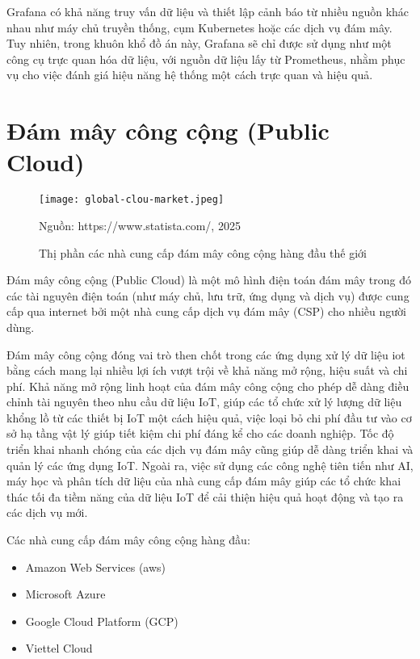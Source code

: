 Grafana có khả năng truy vấn dữ liệu và thiết lập cảnh báo từ nhiều nguồn khác nhau như máy chủ truyền thống, cụm Kubernetes hoặc các dịch vụ đám mây. Tuy nhiên, trong khuôn khổ đồ án này, Grafana sẽ chỉ được sử dụng như một công cụ trực quan hóa dữ liệu, với nguồn dữ liệu lấy từ Prometheus, nhằm phục vụ cho việc đánh giá hiệu năng hệ thống một cách trực quan và hiệu quả.

\section{Đám mây công cộng (Public Cloud)}

\begin{figure}[htbp]
    \centering
    \texttt{[image: global-clou-market.jpeg]}
    \caption{Thị phần các nhà cung cấp đám mây công cộng hàng đầu thế giới}
    \footnotesize{Nguồn: https://www.statista.com/, 2025}
\end{figure}

Đám mây công cộng (Public Cloud) là một mô hình điện toán đám mây trong đó các tài nguyên điện toán (như máy chủ, lưu trữ, ứng dụng và dịch vụ) được cung cấp qua internet bởi một nhà cung cấp dịch vụ đám mây (CSP) cho nhiều người dùng.

Đám mây công cộng đóng vai trò then chốt trong các ứng dụng xử lý dữ liệu \gls{iot} bằng cách mang lại nhiều lợi ích vượt trội về khả năng mở rộng, hiệu suất và chi phí. Khả năng mở rộng linh hoạt của đám mây công cộng cho phép dễ dàng điều chỉnh tài nguyên theo nhu cầu dữ liệu IoT, giúp các tổ chức xử lý lượng dữ liệu khổng lồ từ các thiết bị IoT một cách hiệu quả, việc loại bỏ chi phí đầu tư vào cơ sở hạ tầng vật lý giúp tiết kiệm chi phí đáng kể cho các doanh nghiệp. Tốc độ triển khai nhanh chóng của các dịch vụ đám mây cũng giúp dễ dàng triển khai và quản lý các ứng dụng IoT. Ngoài ra, việc sử dụng các công nghệ tiên tiến như AI, máy học và phân tích dữ liệu của nhà cung cấp đám mây giúp các tổ chức khai thác tối đa tiềm năng của dữ liệu IoT để cải thiện hiệu quả hoạt động và tạo ra các dịch vụ mới.

Các nhà cung cấp đám mây công cộng hàng đầu:
\begin{itemize}
    \item Amazon Web Services (\gls{aws})
    \item Microsoft Azure
    \item Google Cloud Platform (GCP)
    \item Viettel Cloud
\end{itemize}

